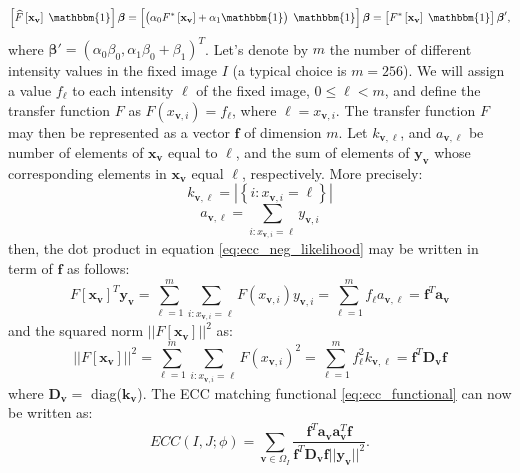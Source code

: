 \begin{displaymath}
    \left[\widehat{F}\left[\mathbf{x}_{\mathbf{v}}\right] \; \mathbbm{1}\right]\boldsymbol{\beta} =
    \left[\left(\alpha_{0}F^{*}\left[\mathbf{x}_{\mathbf{v}}\right]+\alpha_{1}\mathbbm{1}\right) \; \mathbbm{1}\right]\boldsymbol{\beta} =
    \left[F^{*}\left[\mathbf{x}_{\mathbf{v}}\right] \; \mathbbm{1}\right]\boldsymbol{\beta}',
\end{displaymath}
where $\boldsymbol{\beta}' = (\alpha_{0}\beta_{0}, \alpha_{1}\beta_{0} + \beta_{1})^{T}$. Let's denote by $m$ the number of different intensity values in the fixed image $I$ (a typical choice is $m=256$). We will assign a value $f_{\ell}$ to each intensity $\ell$ of the fixed image, $0\leq \ell < m$, and define the transfer function $F$ as $F(x_{\mathbf{v},i}) = f_{\ell}$, where $\ell = x_{\mathbf{v},i}$. The transfer function $F$ may then be represented as a vector $\mathbf{f}$ of dimension $m$. Let $k_{\mathbf{v},\ell}$, and $a_{\mathbf{v},\ell}$ be number of elements of $\mathbf{x}_{\mathbf{v}}$ equal to $\ell$, and the sum of elements of $\mathbf{y}_{\mathbf{v}}$ whose corresponding elements in $\mathbf{x}_{\mathbf{v}}$ equal $\ell$, respectively. More precisely:
\begin{displaymath}
    k_{\mathbf{v},\ell} = |\left\lbrace i : x_{\mathbf{v},i}=\ell \right\rbrace|
\end{displaymath}
\begin{displaymath}
    a_{\mathbf{v}, \ell} = \sum_{i:x_{\mathbf{v},i}=\ell} y_{\mathbf{v},i}
\end{displaymath}
then, the dot product in equation \eqref{eq:ecc_neg_likelihood} may be written in term of $\mathbf{f}$ as follows:
\begin{displaymath}
    F\left[\mathbf{x}_{\mathbf{v}}\right]^{T} \mathbf{y}_{\mathbf{v}} = \sum_{\ell=1}^{m} \sum_{i:x_{\mathbf{v},i}=\ell} F(x_{\mathbf{v},i})y_{\mathbf{v},i}
    =\sum_{\ell=1}^{m} f_{\ell}a_{\mathbf{v}, \ell} = \mathbf{f}^{T}\mathbf{a}_{\mathbf{v}}
\end{displaymath}
and the squared norm $||F[\mathbf{x}_{\mathbf{v}}]||^{2}$ as:
\begin{displaymath}
    ||F\left[\mathbf{x}_{\mathbf{v}}\right]||^{2} = \sum_{\ell=1}^{m} \sum_{i:x_{\mathbf{v},i}=\ell} F(x_{\mathbf{v},i})^{2}
    = \sum_{\ell=1}^{m} f_{\ell}^{2} k_{\mathbf{v}, \ell} = \mathbf{f}^{T} \mathbf{D}_{\mathbf{v}} \mathbf{f}
\end{displaymath}
where $\mathbf{D}_{\mathbf{v}} = $ diag($\mathbf{k}_{\mathbf{v}}$). The ECC matching functional \eqref{eq:ecc_functional} can now be written as:
\begin{equation}\label{eq:ecc_neg_likelihood_vector_form}
    ECC(I, J;\phi) = \sum_{\mathbf{v}\in\Omega_{I}}\frac{\mathbf{f}^{T}\mathbf{a}_{\mathbf{v}}\mathbf{a}_{\mathbf{v}}^{T}\mathbf{f}}
    {\mathbf{f}^{T} \mathbf{D}_{\mathbf{v}} \mathbf{f}||\mathbf{y}_{\mathbf{v}}||^{2}}.
\end{equation}

